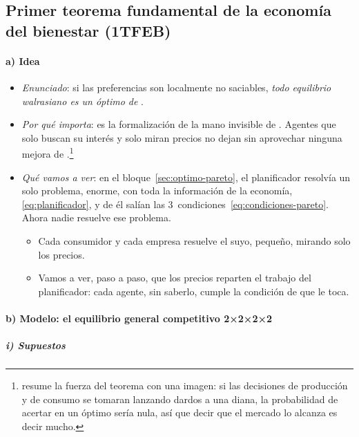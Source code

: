 \documentclass[11pt]{article}
\begin{document}
\subsection{Primer teorema fundamental de la economía del bienestar (1TFEB)}\label{sec:primer-teorema}

\paragraph{a) Idea}

\begin{itemize}
\item \emph{Enunciado}: si las preferencias son localmente no saciables, \emph{todo equilibrio walrasiano es un óptimo de }\nocite{Arrow1951Extension,Debreu1951Coefficient}.
\item \emph{Por qué importa}: es la formalización de la mano invisible de \textcite{Smith1776Wealth}. Agentes que solo buscan su interés y solo miran precios no dejan sin aprovechar ninguna mejora de .\footnote{\textcite{Feldman1987Welfare} resume la fuerza del teorema con una imagen: si las decisiones de producción y de consumo se tomaran lanzando dardos a una diana, la probabilidad de acertar en un óptimo sería nula, así que decir que el mercado lo alcanza es decir mucho.}
\item \emph{Qué vamos a ver}: en el bloque~\ref{sec:optimo-pareto}, el planificador resolvía un solo problema, enorme, con toda la información de la economía, \eqref{eq:planificador}, y de él salían las 3~condiciones~\eqref{eq:condiciones-pareto}. Ahora nadie resuelve ese problema.
  \begin{itemize}
  \item Cada consumidor y cada empresa resuelve el suyo, pequeño, mirando solo los precios.
  \item Vamos a ver, paso a paso, que los precios reparten el trabajo del planificador: cada agente, sin saberlo, cumple la condición de  que le toca.
  \end{itemize}
\end{itemize}

\paragraph{b) Modelo: el equilibrio general competitivo 2×2×2×2}

\subparagraph{i) Supuestos}
\end{document}
